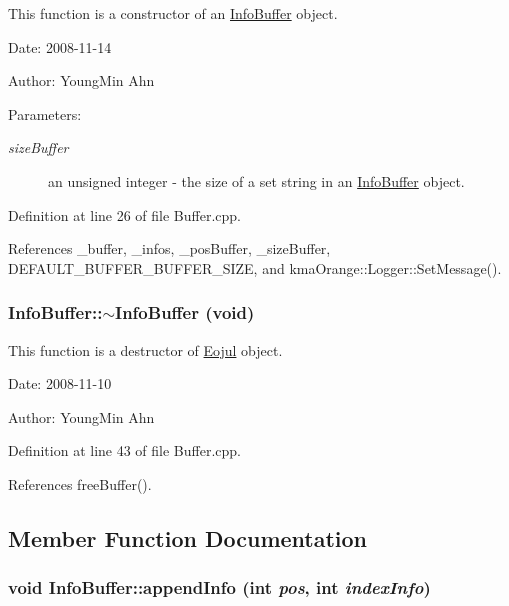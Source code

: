 This function is a constructor of an \hyperlink{classkmaOrange_1_1InfoBuffer}{InfoBuffer} object. 

\begin{Desc}
\item[Date:]2008-11-14 \end{Desc}
\begin{Desc}
\item[Author:]YoungMin Ahn \end{Desc}
\begin{Desc}
\item[Parameters:]
\begin{description}
\item[{\em sizeBuffer}]an unsigned integer - the size of a set string in an \hyperlink{classkmaOrange_1_1InfoBuffer}{InfoBuffer} object. \end{description}
\end{Desc}


Definition at line 26 of file Buffer.cpp.

References \_\-buffer, \_\-infos, \_\-posBuffer, \_\-sizeBuffer, DEFAULT\_\-BUFFER\_\-BUFFER\_\-SIZE, and kmaOrange::Logger::SetMessage().\hypertarget{classkmaOrange_1_1InfoBuffer_a329cdffba17095fca5d72be3d209cd5}{
\subsubsection[{$\sim$InfoBuffer}]{\setlength{\rightskip}{0pt plus 5cm}InfoBuffer::$\sim$InfoBuffer (void)}}
\label{classkmaOrange_1_1InfoBuffer_a329cdffba17095fca5d72be3d209cd5}


This function is a destructor of \hyperlink{classkmaOrange_1_1Eojul}{Eojul} object. 

\begin{Desc}
\item[Date:]2008-11-10 \end{Desc}
\begin{Desc}
\item[Author:]YoungMin Ahn \end{Desc}


Definition at line 43 of file Buffer.cpp.

References freeBuffer().

\subsection{Member Function Documentation}
\hypertarget{classkmaOrange_1_1InfoBuffer_20a9edb5bc18baabef3abc9841bb3e91}{
\subsubsection[{appendInfo}]{\setlength{\rightskip}{0pt plus 5cm}void InfoBuffer::appendInfo (int {\em pos}, \/  int {\em indexInfo})}}
\label{classkmaOrange_1_1InfoBuffer_20a9edb5bc18baabef3abc9841bb3e91}


